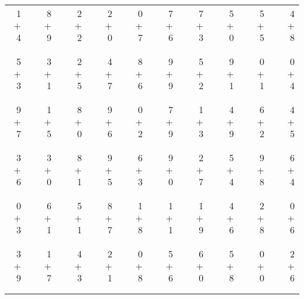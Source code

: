 \documentclass[12pt, letterpaper]{article}
\begin{document}
\begin{tabular}{rrrrrrrrrrrrrrrrrrr}
1 & & 8 & & 2 & & 2 & & 0 & & 7 & & 7 & & 5 & & 5 & & 4\\
$+$ 4 & & $+$ 9 & & $+$ 2 & & $+$ 0 & & $+$ 7 & & $+$ 6 & & $+$ 3 & & $+$ 0 & & $+$ 5 & & $+$ 8\\
\cline{1-1} \cline{3-3} \cline{5-5} \cline{7-7} \cline{9-9} \cline{11-11} \cline{13-13} \cline{15-15} \cline{17-17} \cline{19-19} \\ \\
5 & & 3 & & 2 & & 4 & & 8 & & 9 & & 5 & & 9 & & 0 & & 0\\
$+$ 3 & & $+$ 1 & & $+$ 5 & & $+$ 7 & & $+$ 6 & & $+$ 9 & & $+$ 2 & & $+$ 1 & & $+$ 1 & & $+$ 4\\
\cline{1-1} \cline{3-3} \cline{5-5} \cline{7-7} \cline{9-9} \cline{11-11} \cline{13-13} \cline{15-15} \cline{17-17} \cline{19-19} \\ \\
9 & & 1 & & 8 & & 9 & & 0 & & 7 & & 1 & & 4 & & 6 & & 4\\
$+$ 7 & & $+$ 5 & & $+$ 0 & & $+$ 6 & & $+$ 2 & & $+$ 9 & & $+$ 3 & & $+$ 9 & & $+$ 2 & & $+$ 5\\
\cline{1-1} \cline{3-3} \cline{5-5} \cline{7-7} \cline{9-9} \cline{11-11} \cline{13-13} \cline{15-15} \cline{17-17} \cline{19-19} \\ \\
3 & & 3 & & 8 & & 9 & & 6 & & 9 & & 2 & & 5 & & 9 & & 6\\
$+$ 6 & & $+$ 0 & & $+$ 1 & & $+$ 5 & & $+$ 3 & & $+$ 0 & & $+$ 7 & & $+$ 4 & & $+$ 8 & & $+$ 4\\
\cline{1-1} \cline{3-3} \cline{5-5} \cline{7-7} \cline{9-9} \cline{11-11} \cline{13-13} \cline{15-15} \cline{17-17} \cline{19-19} \\ \\
0 & & 6 & & 5 & & 8 & & 1 & & 1 & & 1 & & 4 & & 2 & & 0\\
$+$ 3 & & $+$ 1 & & $+$ 1 & & $+$ 7 & & $+$ 8 & & $+$ 1 & & $+$ 9 & & $+$ 6 & & $+$ 8 & & $+$ 6\\
\cline{1-1} \cline{3-3} \cline{5-5} \cline{7-7} \cline{9-9} \cline{11-11} \cline{13-13} \cline{15-15} \cline{17-17} \cline{19-19} \\ \\
3 & & 1 & & 4 & & 2 & & 0 & & 5 & & 6 & & 5 & & 0 & & 2\\
$+$ 9 & & $+$ 7 & & $+$ 3 & & $+$ 1 & & $+$ 8 & & $+$ 6 & & $+$ 0 & & $+$ 8 & & $+$ 0 & & $+$ 6\\
\cline{1-1} \cline{3-3} \cline{5-5} \cline{7-7} \cline{9-9} \cline{11-11} \cline{13-13} \cline{15-15} \cline{17-17} \cline{19-19} \\ \\

\end{tabular}
\end{document}
